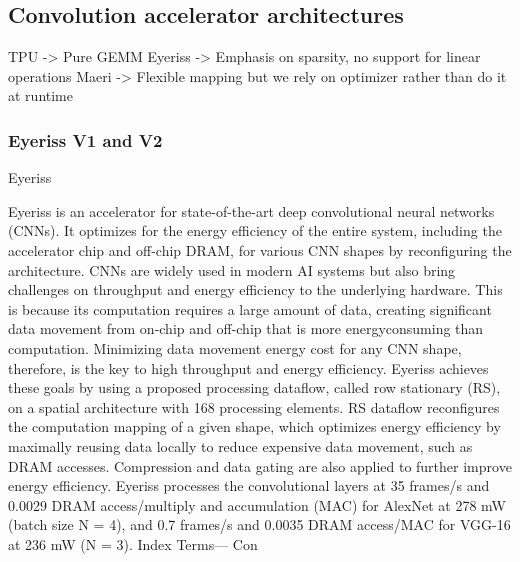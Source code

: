 \subsection{Convolution accelerator architectures}
 
TPU -> Pure GEMM
Eyeriss -> Emphasis on sparsity, no support for linear operations
Maeri -> Flexible mapping but we rely on optimizer rather than do it at runtime


\subsubsection{Eyeriss V1 and V2}

Eyeriss

Eyeriss is an accelerator for state-of-the-art deep
convolutional neural networks (CNNs). It optimizes for the energy
efficiency of the entire system, including the accelerator chip
and off-chip DRAM, for various CNN shapes by reconfiguring
the architecture. CNNs are widely used in modern AI systems
but also bring challenges on throughput and energy efficiency
to the underlying hardware. This is because its computation
requires a large amount of data, creating significant data
movement from on-chip and off-chip that is more energyconsuming than computation. Minimizing data movement energy
cost for any CNN shape, therefore, is the key to high throughput
and energy efficiency. Eyeriss achieves these goals by using a
proposed processing dataflow, called row stationary (RS), on a
spatial architecture with 168 processing elements. RS dataflow
reconfigures the computation mapping of a given shape, which
optimizes energy efficiency by maximally reusing data locally
to reduce expensive data movement, such as DRAM accesses.
Compression and data gating are also applied to further improve
energy efficiency. Eyeriss processes the convolutional layers
at 35 frames/s and 0.0029 DRAM access/multiply and accumulation (MAC) for AlexNet at 278 mW (batch size N = 4), and
0.7 frames/s and 0.0035 DRAM access/MAC for VGG-16
at 236 mW (N = 3).
Index Terms— Con

